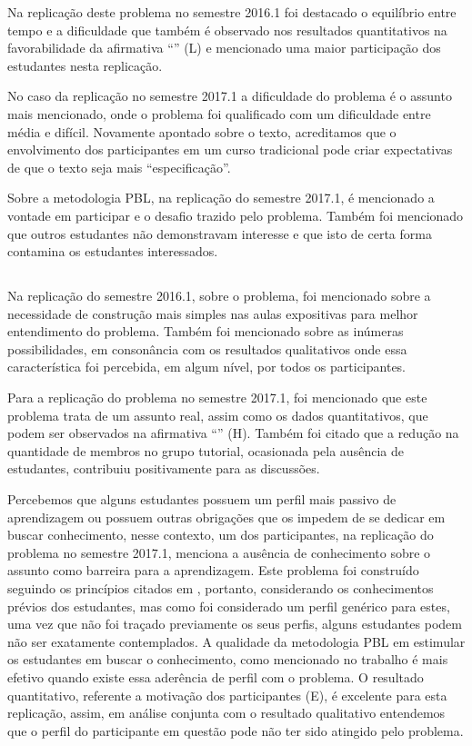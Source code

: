 Na replicação deste problema no semestre 2016.1
foi destacado o equilíbrio entre tempo e a dificuldade
que também é observado nos resultados quantitativos
na favorabilidade da afirmativa ``\LikertPL'' (L)
e mencionado uma maior participação
dos estudantes nesta replicação.

No caso da replicação no semestre 2017.1 a dificuldade
do problema é o assunto mais mencionado, onde o problema foi
qualificado com um dificuldade entre média e difícil.
Novamente apontado sobre o texto, acreditamos que o
envolvimento dos participantes em um curso
tradicional pode criar expectativas de que o texto
seja mais ``especificação''.

Sobre a metodologia PBL, na replicação do semestre 2017.1,
é mencionado a vontade em participar e o desafio trazido
pelo problema.
Também foi mencionado que outros estudantes não
demonstravam interesse e que isto de certa forma
contamina os estudantes interessados.

\subsection{\ProblemaD}

Na replicação do semestre 2016.1, sobre o problema, foi mencionado
sobre a necessidade de construção mais simples nas aulas
expositivas para melhor entendimento do problema.
Também foi mencionado sobre as inúmeras possibilidades, em consonância
com os resultados qualitativos onde essa característica foi
percebida, em algum nível, por todos os participantes.

Para a replicação do problema no semestre 2017.1, foi mencionado
que este problema trata de um assunto real, assim como
os dados quantitativos, que podem ser observados
na afirmativa ``\LikertPH'' (H).
Também foi citado que a redução na quantidade de membros no grupo
tutorial, ocasionada pela ausência de estudantes, contribuiu
positivamente para as discussões.

Percebemos que alguns estudantes possuem um perfil mais passivo
de aprendizagem ou possuem outras obrigações que os impedem
de se dedicar em buscar conhecimento, nesse contexto,
um dos participantes, na replicação do problema no
semestre 2017.1, menciona a ausência de conhecimento
sobre o assunto como barreira para a aprendizagem.
Este problema foi construído seguindo
os princípios citados em \cite{dolmans1997seven},
portanto, considerando os conhecimentos prévios
dos estudantes, mas como foi considerado um perfil
genérico para estes, uma vez que não foi
traçado previamente os seus perfis, alguns estudantes
podem não ser exatamente contemplados.
A qualidade da metodologia PBL em estimular os estudantes
em buscar o conhecimento, como mencionado no trabalho
\cite{savery2015overview} é mais efetivo quando
existe essa aderência de perfil com o problema.
O resultado quantitativo, referente a motivação dos
participantes (E), é excelente para esta
replicação, assim, em análise conjunta com o
resultado qualitativo entendemos que o perfil
do participante em questão pode não ter sido
atingido pelo problema.

